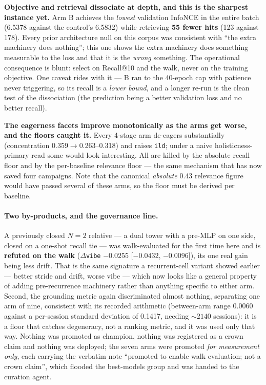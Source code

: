 \documentclass[11pt]{article}
\begin{document}
\textbf{Objective and retrieval dissociate at depth, and this is the sharpest
instance yet.} Arm B achieves the \emph{lowest} validation InfoNCE in the entire
batch (\num{6.5378} against the control's \num{6.5832}) while retrieving
\textbf{\num{55} fewer hits} (\num{123} against \num{178}). Every prior
architecture null on this corpus was consistent with ``the extra machinery does
nothing''; this one shows the extra machinery does something measurable to the loss
and that it is the \emph{wrong} something. The operational consequence is blunt:
select on Recall@10 and the walk, never on the training objective. One caveat rides
with it --- B ran to the \num{40}-epoch cap with patience never triggering, so its
recall is a \emph{lower bound}, and a longer re-run is the clean test of the
dissociation (the prediction being a better validation loss and no better recall).

\textbf{The eagerness facets improve monotonically as the arms get worse, and the
floors caught it.} Every 4-stage arm de-eagers substantially (concentration
\num{0.359}$\to$\numrange{0.263}{0.318}) and raises \texttt{ild}; under a naive
holisticness-primary read some would look interesting. All are killed by the
absolute recall floor and by the per-baseline relevance floor --- the same mechanism
that has now saved four campaigns. Note that the canonical \emph{absolute}
\num{0.43} relevance figure would have passed several of these arms, so the floor
must be derived per baseline.

\paragraph{Two by-products, and the governance line.} A previously closed $N=2$
relative --- a dual tower with a pre-MLP on one side, closed on a one-shot recall
tie --- was walk-evaluated for the first time here and is \textbf{refuted on the
walk} ($\Delta$\texttt{vibe} $-\num{0.0255}$ [$-\num{0.0432}$, $-\num{0.0096}$]),
its one real gain being less drift. That is the same signature a recurrent-cell
variant showed earlier --- better stride and drift, worse vibe --- which now looks
like a general property of adding pre-recurrence machinery rather than anything
specific to either arm. Second, the grounding metric again discriminated almost
nothing, separating one arm of nine, consistent with its recorded arithmetic
(between-arm range \num{0.0060} against a per-session standard deviation of
\num{0.1417}, needing ${\sim}\num{2140}$ sessions): it is a floor that catches
degeneracy, not a ranking metric, and it was used only that way. Nothing was
promoted as champion, nothing was registered as a crown claim and nothing was
deployed; the seven arms were promoted \emph{for measurement only}, each carrying
the verbatim note ``promoted to enable walk evaluation; not a crown claim'', which
flooded the best-models group and was handed to the curation agent.
\end{document}
